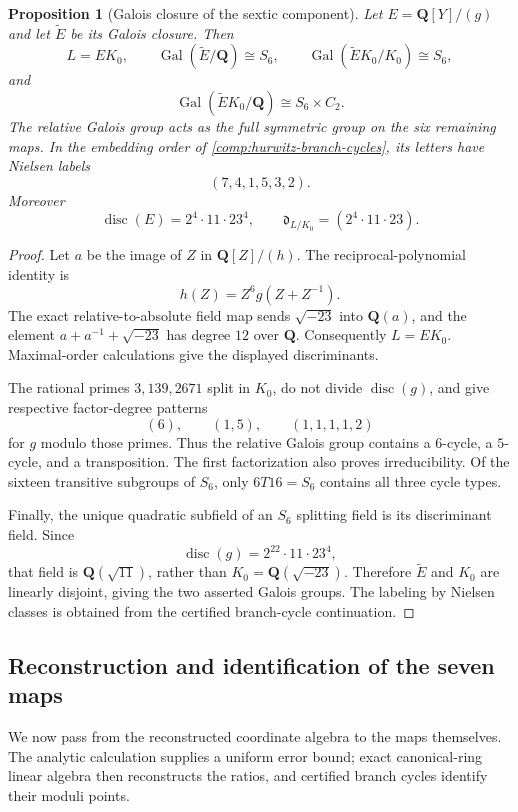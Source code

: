 \documentclass[11pt]{amsart}
\newtheorem{proposition}[proposition]{Proposition}
\theoremstyle{definition}
\theoremstyle{remark}
\newcommand{\QQ}{\mathbf Q}
\newcommand{\Gal}{\operatorname{Gal}}
\newcommand{\disc}{\operatorname{disc}}
\begin{document}
\begin{proposition}[Galois closure of the sextic component]
\label{prop:hurwitz-galois-closure}
Let $E=\QQ[Y]/(g)$ and let $\widetilde E$ be its Galois closure.  Then
\[
 L=EK_0,\qquad
 \Gal(\widetilde E/\QQ)\cong S_6,\qquad
 \Gal(\widetilde E K_0/K_0)\cong S_6,
\]
and
\[
 \Gal(\widetilde E K_0/\QQ)\cong S_6\times C_2.
\]
The relative Galois group acts as the full symmetric group on the six
remaining maps.  In the embedding order of
\cref{comp:hurwitz-branch-cycles}, its letters have Nielsen labels
\[
 (7,4,1,5,3,2).
\]
Moreover
\[
 \disc(E)=2^4\cdot11\cdot23^4,\qquad
 \mathfrak d_{L/K_0}=(2^4\cdot11\cdot23).
\]
\end{proposition}

\begin{proof}
Let $a$ be the image of $Z$ in $\QQ[Z]/(h)$.
The reciprocal-polynomial identity is
\[
 h(Z)=Z^6g(Z+Z^{-1}).
\]
The exact relative-to-absolute field map sends $\sqrt{-23}$ into $\QQ(a)$,
and the element $a+a^{-1}+\sqrt{-23}$ has degree $12$ over $\QQ$.
Consequently $L=EK_0$.  Maximal-order calculations give the displayed
discriminants.

The rational primes $3,139,2671$ split in $K_0$, do not divide $\disc(g)$,
and give respective factor-degree patterns
\[
 (6),\qquad(1,5),\qquad(1,1,1,1,2)
\]
for $g$ modulo those primes.  Thus the relative Galois group contains a
$6$-cycle, a $5$-cycle, and a transposition.  The first factorization also
proves irreducibility.  Of the sixteen transitive subgroups of $S_6$, only
$6T16=S_6$ contains all three cycle types.

Finally, the unique quadratic subfield of an $S_6$ splitting field is its
discriminant field.  Since
\[
 \disc(g)=2^{22}\cdot11\cdot23^4,
\]
that field is $\QQ(\sqrt{11})$, rather than $K_0=\QQ(\sqrt{-23})$.
Therefore $\widetilde E$ and $K_0$ are linearly disjoint, giving the two
asserted Galois groups.  The labeling by Nielsen classes is obtained from
the certified branch-cycle continuation.
\end{proof}

\subsection{Reconstruction and identification of the seven maps}

We now pass from the reconstructed coordinate algebra to the maps themselves.
The analytic calculation supplies a uniform error bound; exact
canonical-ring linear algebra then reconstructs the ratios, and certified
branch cycles identify their moduli points.
\end{document}
